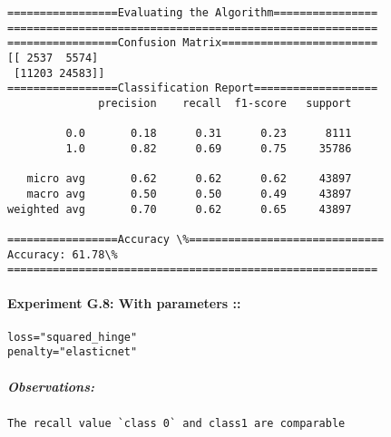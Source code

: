 \documentclass[11pt]{article}
\begin{document}
    \begin{Verbatim}[commandchars=\\\{\}]
=================Evaluating the Algorithm================
=========================================================
=================Confusion Matrix========================
[[ 2537  5574]
 [11203 24583]]
=================Classification Report===================
              precision    recall  f1-score   support

         0.0       0.18      0.31      0.23      8111
         1.0       0.82      0.69      0.75     35786

   micro avg       0.62      0.62      0.62     43897
   macro avg       0.50      0.50      0.49     43897
weighted avg       0.70      0.62      0.65     43897

=================Accuracy \%==============================
Accuracy: 61.78\%
=========================================================

    \end{Verbatim}

    \paragraph{Experiment G.8: With parameters
::}\label{experiment-g.8-with-parameters}

\begin{verbatim}
loss="squared_hinge"
penalty="elasticnet"
\end{verbatim}

\subparagraph{Observations:}\label{observations}

\begin{verbatim}
The recall value `class 0` and class1 are comparable
\end{verbatim}
\end{document}
